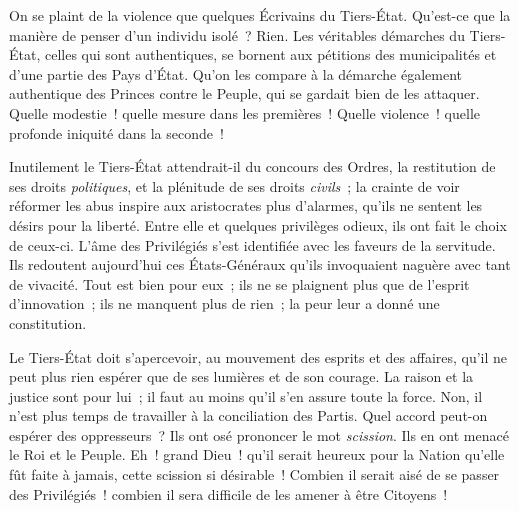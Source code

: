 \documentclass[french,twoside]{book} %
\begin{document}
On se plaint de la violence que quelques Écrivains du Tiers-État. Qu’est-ce que la manière de penser d’un individu isolé ? Rien. Les véritables démarches du Tiers-État, celles qui sont authentiques, se bornent aux pétitions des municipalités et d’une partie des Pays d’État. Qu’on les compare à la démarche également authentique des Princes contre le Peuple, qui se gardait bien de les attaquer. Quelle modestie ! quelle mesure dans les premières ! Quelle violence ! quelle profonde iniquité dans la seconde !\par
Inutilement le Tiers-État attendrait-il du concours des Ordres, la restitution de ses droits {\itshape politiques}, et la plénitude de ses droits {\itshape civils} ; la crainte de voir réformer les abus inspire aux aristocrates plus d’alarmes, qu’ils ne sentent les désirs pour la liberté. Entre elle et quelques privilèges odieux, ils ont fait le choix de ceux-ci. L’âme des Privilégiés s’est identifiée avec les faveurs de la servitude. Ils redoutent aujourd’hui ces États-Généraux qu’ils invoquaient naguère avec tant de vivacité. Tout est bien pour eux ; ils ne se plaignent plus que de l’esprit d’innovation ; ils ne manquent plus de rien ; la peur leur a donné une constitution.\par
Le Tiers-État doit s’apercevoir, au mouvement des esprits et des affaires, qu’il ne peut plus rien espérer que de ses lumières et de son courage. La raison et la justice sont pour lui ; il faut au moins qu’il s’en assure toute la force. Non, il n’est plus temps de travailler à la conciliation des Partis. Quel accord peut-on espérer des oppresseurs ? Ils ont osé prononcer le mot {\itshape scission}. Ils en ont menacé le Roi et le Peuple. Eh ! grand Dieu ! qu’il serait heureux pour la Nation qu’elle fût faite à jamais, cette scission si désirable ! Combien il serait aisé de se passer des Privilégiés ! combien il sera difficile de les amener à être Citoyens !\par
\end{document}
